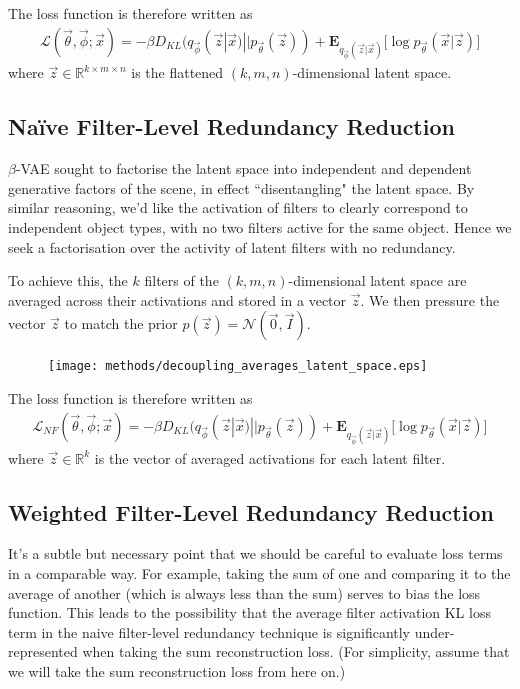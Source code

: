 The loss function is therefore written as 
\begin{align}
\mathcal{L}(\vec{\theta}, \vec{\phi}; \vec{x}) = -\beta D_{KL}(q_{\vec{\phi}}(\vec{z}|\vec{x}) || p_{\vec{\theta}}(\vec{z})) + \mathbf{E}_{q_{\vec{\phi}}(\vec{z}|\vec{x})}\big[\log p_{\vec{\theta}}(\vec{x} | \vec{z}) \big]
\end{align}
where $\vec{z} \in \mathbb{R}^{k \times m \times n}$ is the flattened $(k, m, n)$-dimensional latent space.


%
%
\subsection{Na{\"i}ve Filter-Level Redundancy Reduction}

$\beta$-VAE sought to factorise the latent space into independent and dependent generative factors of the scene, in effect ``disentangling" the latent space. By similar reasoning, we'd like the activation of filters to clearly correspond to independent object types, with no two filters active for the same object. Hence we seek a factorisation over the activity of latent filters with no redundancy.

To achieve this, the $k$ filters of the $(k, m, n)$-dimensional latent space are averaged across their activations and stored in a vector $\vec{z}$. We then pressure the vector $\vec{z}$ to match the prior $p(\vec{z}) = \mathcal{N}(\vec{0}, \vec{I})$.\\

\begin{figure}[H]
\centering
\captionsetup{justification=centering}
\texttt{[image: methods/decoupling\_averages\_latent\_space.eps]}
\label{fig:decoupling_averages_latent_space}
\end{figure}

The loss function is therefore written as 
\begin{align}
\mathcal{L}_{NF}(\vec{\theta}, \vec{\phi}; \vec{x}) = -\beta D_{KL}(q_{\vec{\phi}}(\vec{z}|\vec{x}) || p_{\vec{\theta}}(\vec{z})) + \mathbf{E}_{q_{\vec{\phi}}(\vec{z}|\vec{x})}\big[\log p_{\vec{\theta}}(\vec{x} | \vec{z}) \big]
\end{align}
where $\vec{z} \in \mathbb{R}^{k}$ is the vector of averaged activations for each latent filter.


%
%
\subsection{Weighted Filter-Level Redundancy Reduction}
It's a subtle but necessary point that we should be careful to evaluate loss terms in a comparable way. For example, taking the sum of one and comparing it to the average of another (which is always less than the sum) serves to bias the loss function. This leads to the possibility that the average filter activation KL loss term in the naive filter-level redundancy technique is significantly under-represented when taking the sum reconstruction loss. (For simplicity, assume that we will take the sum reconstruction loss from here on.)

